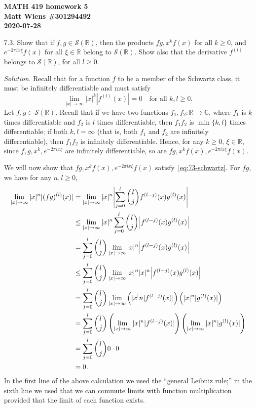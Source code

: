 \documentclass{article}
\newcommand{\C}{\mathbb{C}}
\newcommand{\R}{\mathbb{R}}
\newcommand{\fS}{\mathcal{S}}
\begin{document}
\textbf{MATH 419 homework 5} \\
\textbf{Matt Wiens \#301294492} \\
\textbf{2020-07-28}

7.3. Show that if $f, g \in \fS(\R)$, then the products
$fg, x^kf(x)$ for all $k \geq 0$, and $e^{-2 \pi i x \xi}f(x)$
for all $\xi \in \R$ belong to $\fS(\R)$. Show also that the
derivative $f^{(l)}$ belongs to $\fS(\R)$, for all $l \geq 0$.

\textit{Solution.}
Recall that for a function $f$ to be a member of the Schwartz
class, it must be infinitely differentiable and must satisfy
%
\begin{equation}
    \lim_{|x| \to \infty} |x|^k |f^{(l)}(x)| = 0 \quad \text{for all $k, l \geq 0$}
    .
    \label{eq:73-schwartz}
\end{equation}
%
Let $f, g \in \fS(\R)$. Recall that if we have two functions $f_1, f_2:
\R \to \C$, where $f_1$ is $k$ times differentiable and $f_2$ is $l$
times differentiable, then $f_1 f_2$ is $\min \{k, l\}$ times
differentiable; if both $k, l = \infty$ (that is, both $f_1$ and $f_2$
are infinitely differentiable), then $f_1 f_2$ is infinitely
differentiable. Hence, for any $k \geq 0$, $\xi \in \R$, since
$f, g, x^k, e^{-2 \pi i x \xi}$ are infinitely differentiable,
so are $fg, x^k f(x), e^{- 2 \pi i x \xi} f(x)$.

We will now show that $fg, x^k f(x), e^{- 2 \pi i x \xi} f(x)$
satisfy~\eqref{eq:73-schwartz}. For $fg$, we have for any $n, l \geq 0$,
%
\begin{align*}
    \lim_{|x| \to \infty} |x|^n |(fg)^{(l)}(x)|
        &= \lim_{|x| \to \infty} |x|^n \envert[4]{\sum_{j = 0}^l \binom{l}{j} f^{(l - j)}(x) g^{(l)}(x)} \\
        &\leq \lim_{|x| \to \infty} |x|^n \sum_{j = 0}^l \binom{l}{j} \envert{f^{(l - j)}(x) g^{(l)}(x)} \\
        &= \sum_{j = 0}^l \binom{l}{j} \lim_{|x| \to \infty} |x|^n \envert{f^{(l - j)}(x) g^{(l)}(x)} \\
        &\leq \sum_{j = 0}^l \binom{l}{j} \lim_{|x| \to \infty} |x|^n |x|^n \envert{f^{(l - j)}(x) g^{(l)}(x)} \\
        &= \sum_{j = 0}^l \binom{l}{j} \lim_{|x| \to \infty} \del{|x^|n |f^{(l - j)}(x)|} \del{|x|^n |g^{(l)}(x)|} \\
        &= \sum_{j = 0}^l \binom{l}{j} \del{\lim_{|x| \to \infty} |x|^n |f^{(l - j)}(x)|} \del{\lim_{|x| \to \infty} |x|^n |g^{(l)}(x)|} \\
        &= \sum_{j = 0}^l \binom{l}{j} 0 \cdot 0 \\
        &= 0
    .
\end{align*}
%
In the first line of the above calculation we used the ``general Leibniz
rule;'' in the sixth line we used that we can commute limits with
function multiplication provided that the limit of each function exists.
\end{document}
